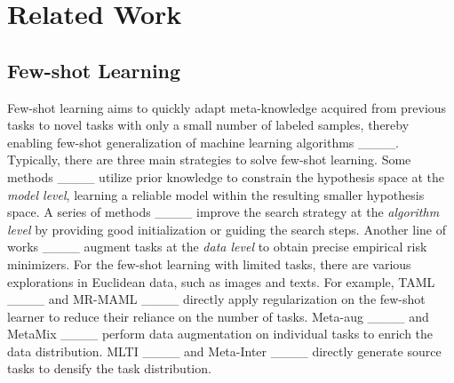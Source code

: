 \section{Related Work}
\subsection{Few-shot Learning}
Few-shot learning aims to quickly adapt meta-knowledge acquired from previous tasks to novel tasks with only a small number of labeled samples, thereby enabling few-shot generalization of machine learning algorithms ____. %
Typically, there are three main strategies to solve few-shot learning. Some methods ____ utilize prior knowledge to constrain the hypothesis space at the \textit{model level}, learning a reliable model within the resulting smaller hypothesis space. A series of methods ____ improve the search strategy at the \textit{algorithm level} by providing good initialization or guiding the search steps. Another line of works ____ augment tasks at the \textit{data level} to obtain precise empirical risk minimizers. For the few-shot learning with limited tasks, there are various explorations in Euclidean data, such as images and texts. For example, TAML ____ and MR-MAML ____ directly apply regularization on the few-shot learner to reduce their reliance on the number of tasks. Meta-aug ____ and MetaMix ____ perform data augmentation on individual tasks to enrich the data distribution. MLTI ____ and Meta-Inter ____ directly generate source tasks to densify the task distribution. 


